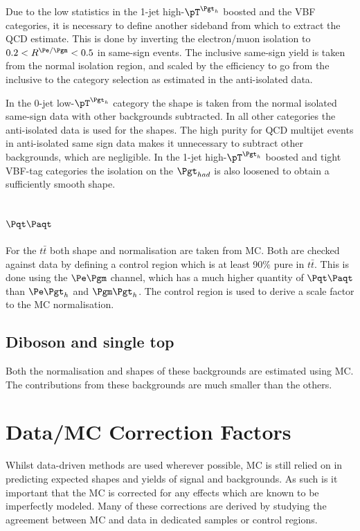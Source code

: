Due to the low statistics in the 1-jet high-$\pT^{\Pgth}$ boosted and the VBF
categories, it is necessary to define another
sideband from which to extract the QCD estimate. This is done by inverting the
electron/muon isolation to $0.2<R^{\Pe/\Pgm}<0.5$ in same-sign events. The
inclusive same-sign yield is taken from the normal isolation region, and scaled
by the efficiency to go from the inclusive to the category selection as
estimated in the anti-isolated data. 

In the 0-jet low-$\pT^{\Pgth}$ category the shape is taken from the normal
isolated same-sign data with other backgrounds subtracted. In all other
categories the anti-isolated data is used for the shapes. The high purity for
QCD multijet events in anti-isolated same sign data makes it unnecessary to
subtract other backgrounds, which are negligible. In the 1-jet
high-$\pT^{\Pgth}$ boosted and tight VBF-tag categories the isolation on the
$\Pgt_{had}$ is also loosened to obtain a sufficiently smooth shape.  

\subsection{$\ttbar$}
\label{sec:backgroundEstimation_TT}

For the $t \bar{t}$ both shape and normalisation are taken from MC. Both are checked
against data by defining a control region which is at least 90$\%$ pure in
$t \bar{t}$. This is done using the $\emu$ channel, which has a much higher
quantity of $\ttbar$ than $\etau$ and $\mutau$. The control region is used to
derive a scale factor to the \ac{MC} normalisation. 

\subsection{Diboson and single top}
Both the normalisation and shapes of these backgrounds are estimated using MC.
The contributions from these backgrounds are much smaller than the others.

\section{Data/MC Correction Factors}
\label{sec:datamcfactors}

Whilst data-driven methods are used wherever possible, MC is still
relied on in predicting expected shapes and yields of signal and backgrounds.
As such is it important that the MC is corrected for
any effects which are known to be imperfectly modeled. Many of these corrections
are derived by studying the agreement between \ac{MC} and data in dedicated
samples or control regions.

